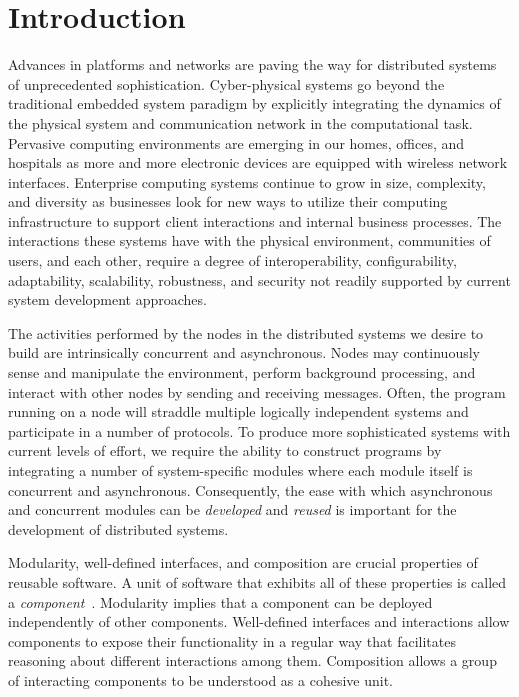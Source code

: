 \section{Introduction\label{introduction}}

Advances in platforms and networks are paving the way for distributed systems of unprecedented sophistication.
Cyber-physical systems go beyond the traditional embedded system paradigm by explicitly integrating the dynamics of the physical system and communication network in the computational task.
Pervasive computing environments are emerging in our homes, offices, and hospitals as more and more electronic devices are equipped with wireless network interfaces.
Enterprise computing systems continue to grow in size, complexity, and diversity as businesses look for new ways to utilize their computing infrastructure to support client interactions and internal business processes.
The interactions these systems have with the physical environment, communities of users, and each other, require a degree of interoperability, configurability, adaptability, scalability, robustness, and security not readily supported by current system development approaches.

The activities performed by the nodes in the distributed systems we desire to build are intrinsically concurrent and asynchronous.
Nodes may continuously sense and manipulate the environment, perform background processing, and interact with other nodes by sending and receiving messages.
Often, the program running on a node will straddle multiple logically independent systems and participate in a number of protocols.
To produce more sophisticated systems with current levels of effort, we require the ability to construct programs by integrating a number of system-specific modules where each module itself is concurrent and asynchronous.
Consequently, the ease with which asynchronous and concurrent modules can be \emph{developed} and \emph{reused} is important for the development of distributed systems.

Modularity, well-defined interfaces, and composition are crucial properties of reusable software.
A unit of software that exhibits all of these properties is called a \emph{component}~\cite{szyperski2002component}.
Modularity implies that a component can be deployed independently of other components.
Well-defined interfaces and interactions allow components to expose their functionality in a regular way that facilitates reasoning about different interactions among them.
Composition allows a group of interacting components to be understood as a cohesive unit.


